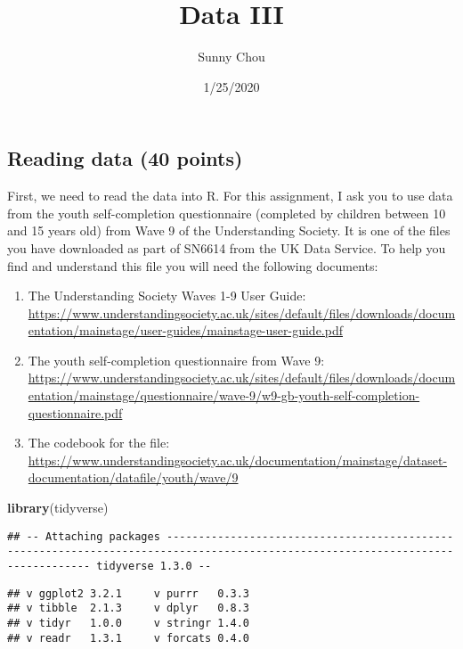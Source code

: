 \documentclass[
]{article}
\title{Data III}
\author{Sunny Chou}
\date{1/25/2020}
\newenvironment{Shaded}{\begin{snugshade}}{\end{snugshade}}
\newcommand{\KeywordTok}[1]{\textcolor[rgb]{0.13,0.29,0.53}{\textbf{#1}}}
\newcommand{\NormalTok}[1]{#1}
\providecommand{\tightlist}{%
  \setlength{\itemsep}{0pt}\setlength{\parskip}{0pt}}
\begin{document}
\maketitle

\hypertarget{reading-data-40-points}{%
\subsection{Reading data (40 points)}\label{reading-data-40-points}}

First, we need to read the data into R. For this assignment, I ask you
to use data from the youth self-completion questionnaire (completed by
children between 10 and 15 years old) from Wave 9 of the Understanding
Society. It is one of the files you have downloaded as part of SN6614
from the UK Data Service. To help you find and understand this file you
will need the following documents:

\begin{enumerate}
\def\labelenumi{\arabic{enumi})}
\tightlist
\item
  The Understanding Society Waves 1-9 User Guide:
  \url{https://www.understandingsociety.ac.uk/sites/default/files/downloads/documentation/mainstage/user-guides/mainstage-user-guide.pdf}
\item
  The youth self-completion questionnaire from Wave 9:
  \url{https://www.understandingsociety.ac.uk/sites/default/files/downloads/documentation/mainstage/questionnaire/wave-9/w9-gb-youth-self-completion-questionnaire.pdf}
\item
  The codebook for the file:
  \url{https://www.understandingsociety.ac.uk/documentation/mainstage/dataset-documentation/datafile/youth/wave/9}
\end{enumerate}

\begin{Shaded}
\begin{Highlighting}[]
\KeywordTok{library}\NormalTok{(tidyverse)}
\end{Highlighting}
\end{Shaded}

\begin{verbatim}
## -- Attaching packages -------------------------------------------------------------------------------------------------------------------------------- tidyverse 1.3.0 --
\end{verbatim}

\begin{verbatim}
## v ggplot2 3.2.1     v purrr   0.3.3
## v tibble  2.1.3     v dplyr   0.8.3
## v tidyr   1.0.0     v stringr 1.4.0
## v readr   1.3.1     v forcats 0.4.0
\end{verbatim}
\end{document}
